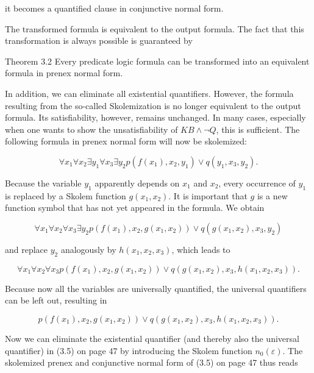 \documentclass[10pt]{article}
\begin{document}
it becomes a quantified clause in conjunctive normal form.

The transformed formula is equivalent to the output formula. The fact that this transformation is always possible is guaranteed by

\begin{displayquote}
Theorem 3.2 Every predicate logic formula can be transformed into an equivalent formula in prenex normal form.
\end{displayquote}

In addition, we can eliminate all existential quantifiers. However, the formula resulting from the so-called Skolemization is no longer equivalent to the output formula. Its satisfiability, however, remains unchanged. In many cases, especially when one wants to show the unsatisfiability of $K B \wedge \neg Q$, this is sufficient. The following formula in prenex normal form will now be skolemized:

$$
\forall x_{1} \forall x_{2} \exists y_{1} \forall x_{3} \exists y_{2} p\left(f\left(x_{1}\right), x_{2}, y_{1}\right) \vee q\left(y_{1}, x_{3}, y_{2}\right) .
$$

Because the variable $y_{1}$ apparently depends on $x_{1}$ and $x_{2}$, every occurrence of $y_{1}$ is replaced by a Skolem function $g\left(x_{1}, x_{2}\right)$. It is important that $g$ is a new function symbol that has not yet appeared in the formula. We obtain

$$
\forall x_{1} \forall x_{2} \forall x_{3} \exists y_{2} p\left(f\left(x_{1}\right), x_{2}, g\left(x_{1}, x_{2}\right)\right) \vee q\left(g\left(x_{1}, x_{2}\right), x_{3}, y_{2}\right)
$$

and replace $y_{2}$ analogously by $h\left(x_{1}, x_{2}, x_{3}\right)$, which leads to

$$
\forall x_{1} \forall x_{2} \forall x_{3} p\left(f\left(x_{1}\right), x_{2}, g\left(x_{1}, x_{2}\right)\right) \vee q\left(g\left(x_{1}, x_{2}\right), x_{3}, h\left(x_{1}, x_{2}, x_{3}\right)\right) .
$$

Because now all the variables are universally quantified, the universal quantifiers can be left out, resulting in

$$
p\left(f\left(x_{1}\right), x_{2}, g\left(x_{1}, x_{2}\right)\right) \vee q\left(g\left(x_{1}, x_{2}\right), x_{3}, h\left(x_{1}, x_{2}, x_{3}\right)\right) .
$$

Now we can eliminate the existential quantifier (and thereby also the universal quantifier) in (3.5) on page 47 by introducing the Skolem function $n_{0}(\varepsilon)$. The skolemized prenex and conjunctive normal form of (3.5) on page 47 thus reads
\end{document}
